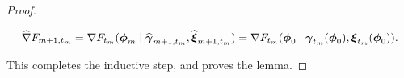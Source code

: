 \begin{proof}
\begin{enumerate}
        \begin{equation}
            \widehat \nabla F_{m+1,t_m} = \nabla F_{t_m}(\boldsymbol{\phi}_m \mid \widehat {\boldsymbol{\gamma}}_{m+1,t_m}, \widehat {\boldsymbol{\xi}}_{m+1,t_m}) = \nabla F_{t_m}(\boldsymbol{\phi}_0 \mid \boldsymbol{\gamma}_{t_m}(\boldsymbol{\phi}_0), \boldsymbol{\xi}_{t_m}(\boldsymbol{\phi}_0)).
        \end{equation}
    \end{enumerate}
    This completes the inductive step, and proves the lemma.
\end{proof}